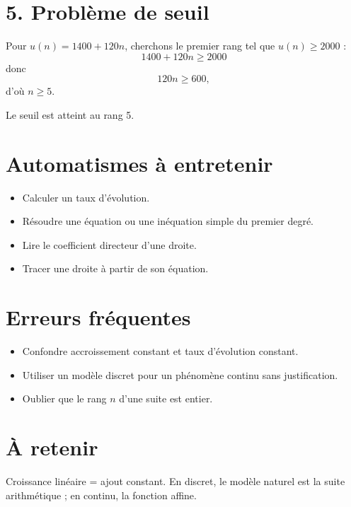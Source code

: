\section{5. Problème de seuil}
Pour $u(n)=1400+120n$, cherchons le premier rang tel que $u(n)\ge2000$ :
\[
1400+120n\ge2000
\]
donc
\[
120n\ge600,
\]
d'où $n\ge5$.

Le seuil est atteint au rang 5.

\section{Automatismes à entretenir}
\begin{itemize}
\item Calculer un taux d'évolution.
\item Résoudre une équation ou une inéquation simple du premier degré.
\item Lire le coefficient directeur d'une droite.
\item Tracer une droite à partir de son équation.
\end{itemize}

\section{Erreurs fréquentes}
\begin{itemize}
\item Confondre accroissement constant et taux d'évolution constant.
\item Utiliser un modèle discret pour un phénomène continu sans justification.
\item Oublier que le rang $n$ d'une suite est entier.
\end{itemize}

\section{À retenir}
Croissance linéaire = ajout constant. En discret, le modèle naturel est la suite arithmétique ; en continu, la fonction affine.
